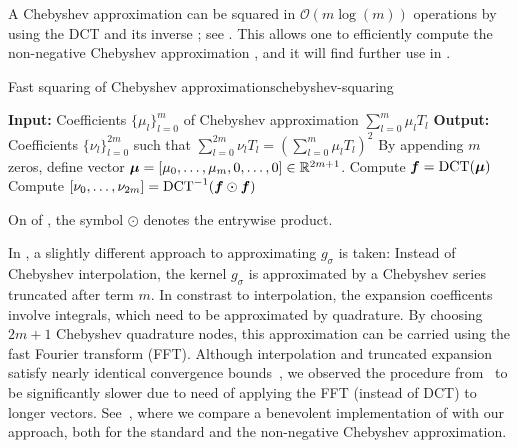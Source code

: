 A Chebyshev approximation can be squared in $\mathcal{O}(m \log(m))$ operations by using the DCT and its inverse \cite{baszenski-1997-fast-polynomial}; see . This allows one to efficiently compute the non-negative Chebyshev approximation , and it will find further use in . 

\begin{algo}{Fast squaring of Chebyshev approximations}{chebyshev-squaring}
    \begin{algorithmic}[1]
        \Statex \textbf{Input:} Coefficients $\{ \mu_l \}_{l=0}^{m}$ of Chebyshev approximation $\sum_{l=0}^{m} \mu_l T_l$
        \Statex \textbf{Output:} Coefficients $\{ \nu_l \}_{l=0}^{2m}$ such that $\sum_{l=0}^{2m} \nu_l T_l = (\sum_{l=0}^{m} \mu_l T_l)^2$
        \State By appending $m$ zeros, define vector $\boldsymbol{\mu} = [\mu_0, \ldots, \mu_m,0,\ldots,0 ] \in \mathbb{R}^{2m + 1}$.
    \State Compute $\boldsymbol{f} = \operatorname{DCT}(\boldsymbol{\mu})$
    \State Compute $[\nu_0, \dots, \nu_{2m}] = \operatorname{DCT}^{-1}(\boldsymbol{f} \odot \boldsymbol{f})$
    \label{lin:inverse-DCT}
    \end{algorithmic}
\end{algo}
On  of , the symbol $\odot$ denotes the entrywise product. 

In \cite{lin-2017-randomized-estimation}, a slightly different approach to approximating $g_{\sigma}$ is taken: Instead of Chebyshev interpolation,
the kernel $g_{\sigma}$ is approximated by a Chebyshev series~\cite[Chapter 4]{trefethen-2020-approximation-theory} truncated after term $m$. In constrast to interpolation, the expansion coefficents involve integrals, which need to be approximated by quadrature. By choosing $2m+1$ Chebyshev quadrature nodes, this approximation can be carried using the fast Fourier transform (FFT). Although interpolation and truncated expansion satisfy nearly identical convergence bounds~\cite[Theorem 8.2]{trefethen-2020-approximation-theory}, we observed the procedure from~\cite{lin-2017-randomized-estimation} to be significantly slower due to need of applying the FFT (instead of DCT) to longer vectors. See~, where we compare a benevolent implementation of \cite[Algorithm 1]{lin-2017-randomized-estimation} with our approach, both for the standard and the non-negative Chebyshev approximation.%

